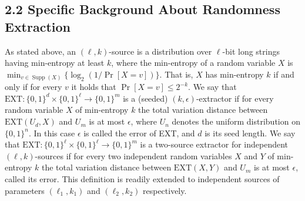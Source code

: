 \subsection*{2.2 Specific Background About Randomness Extraction}
As stated above, an $(\ell,k)$-source is a distribution over $\ell$-bit long strings having min-entropy at least $k$, where the min-entropy of a random variable $X$ is $\min_{v\in\operatorname{Supp}(X)}\{\log_2(1/\Pr[X=v])\}$. That is, $X$ has min-entropy $k$ if and only if for every $v$ it holds that $\Pr[X=v]\le2^{-k}$.
We say that $\mathrm{EXT}:\{0,1\}^d\times\{0,1\}^\ell\to\{0,1\}^m$ is a (seeded) $(k,\epsilon)$-extractor if for every random variable $X$ of min-entropy $k$ the total variation distance between $\mathrm{EXT}(U_d,X)$ and $U_m$ is at most $\epsilon$, where $U_n$ denotes the uniform distribution on $\{0,1\}^n$. In this case $\epsilon$ is called the error of EXT, and $d$ is its seed length.
We say that $\mathrm{EXT}:\{0,1\}^\ell\times\{0,1\}^\ell\to\{0,1\}^m$ is a two-source extractor for independent $(\ell,k)$-sources if for every two independent random variables $X$ and $Y$ of min-entropy $k$ the total variation distance between $\mathrm{EXT}(X,Y)$ and $U_m$ is at most $\epsilon$, called its error. This definition is readily extended to independent sources of parameters $(\ell_1,k_1)$ and $(\ell_2,k_2)$ respectively.
